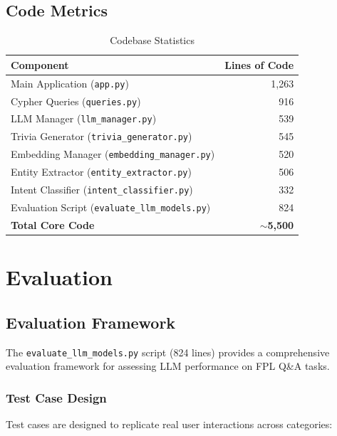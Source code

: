 \documentclass[11pt, a4paper]{article}
\begin{document}
\subsection{Code Metrics}

\begin{table}[H]
\centering
\caption{Codebase Statistics}
\label{tab:code_metrics}
\begin{tabular}{@{}lr@{}}
\toprule
\textbf{Component} & \textbf{Lines of Code} \\
\midrule
Main Application (\texttt{app.py}) & 1,263 \\
Cypher Queries (\texttt{queries.py}) & 916 \\
LLM Manager (\texttt{llm\_manager.py}) & 539 \\
Trivia Generator (\texttt{trivia\_generator.py}) & 545 \\
Embedding Manager (\texttt{embedding\_manager.py}) & 520 \\
Entity Extractor (\texttt{entity\_extractor.py}) & 506 \\
Intent Classifier (\texttt{intent\_classifier.py}) & 332 \\
Evaluation Script (\texttt{evaluate\_llm\_models.py}) & 824 \\
\midrule
\textbf{Total Core Code} & \textbf{$\sim$5,500} \\
\bottomrule
\end{tabular}
\end{table}

\section{Evaluation}
\label{sec:evaluation}

\subsection{Evaluation Framework}
The \texttt{evaluate\_llm\_models.py} script (824 lines) provides a comprehensive evaluation framework for assessing LLM performance on FPL Q\&A tasks.

\subsubsection{Test Case Design}
Test cases are designed to replicate real user interactions across categories:
\end{document}
